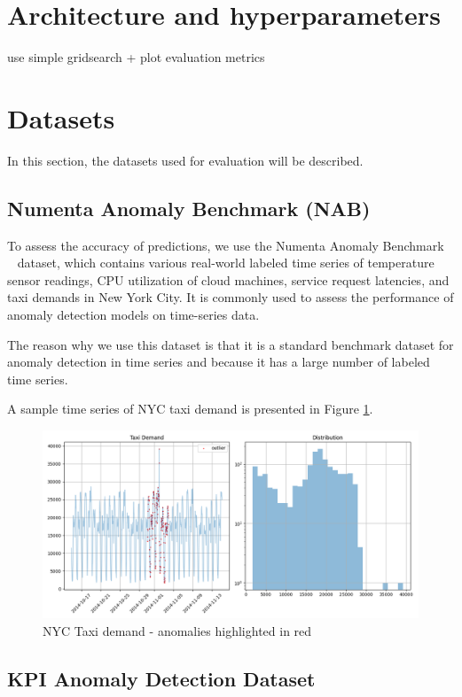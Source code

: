 \documentclass[a4paper, twoside]{report}
\theoremstyle{definition}
\numberwithin{equation}{section}
\begin{document}
\section{Architecture and hyperparameters}

use simple gridsearch + plot evaluation metrics

\section{Datasets}

In this section, the datasets used for evaluation will be described.

\subsection{Numenta Anomaly Benchmark (NAB)}
To assess the accuracy of predictions, we use the Numenta Anomaly Benchmark ~\cite{Ahmad2017Unsupervised} dataset,
which contains various real-world labeled time series of temperature sensor readings, CPU utilization of cloud machines, service
request latencies, and taxi demands in New York City. It is commonly used to assess the performance of anomaly detection
models on time-series data.

The reason why we use this dataset is that it is a standard benchmark dataset
for anomaly detection in time series and because it has a large number of labeled time series.

A sample time series of NYC taxi demand is presented in Figure \ref{fig:NAB_example_nyc_taxi}.
\begin{figure}[h!]
    \centering
    \includegraphics[scale=0.48]{NAB_example_nyc_taxi.png}
    \caption{NYC Taxi demand - anomalies highlighted in red}
    \label{fig:NAB_example_nyc_taxi}
\end{figure}

\subsection{KPI Anomaly Detection Dataset}
\end{document}
